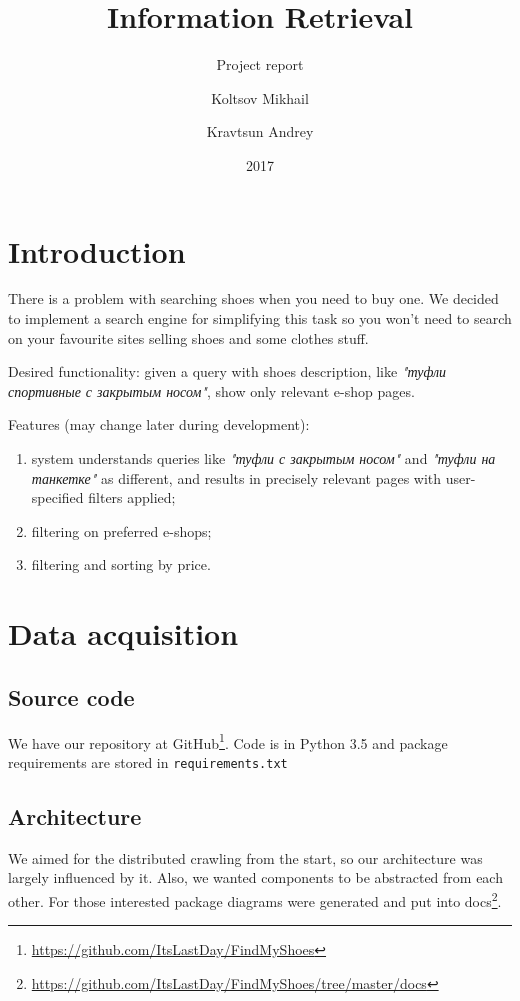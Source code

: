 \documentclass[format=sigconf]{acmart}
\title{Information Retrieval}
\subtitle{Project report}
\author{Koltsov Mikhail}
\author{Kravtsun Andrey}
\date{2017}
\begin{document}
\maketitle

\section{Introduction}
There is a problem with searching shoes when you need to buy one. We decided to implement a search engine for sim\-pli\-fy\-ing this task so you won't need to search on your favourite sites selling shoes and some clothes stuff.

Desired functionality: given a query with shoes description, like \textit{"туфли спортивные с закрытым носом"}, show only re\-le\-vant e-shop pages.

Features (may change later during development):
\begin{enumerate}
    \item system understands queries like \textit{"туфли с закрытым носом"} and \textit{"туфли на танкетке"} as different, and results in precisely relevant pages with user-specified filters applied;
    \item filtering on preferred e-shops;
    \item filtering and sorting by price.
\end{enumerate}

\section{Data acquisition}
\subsection{Source code}
    We have our repository at GitHub\footnote{\url{https://github.com/ItsLastDay/FindMyShoes}}. 
    Code is in Python 3.5 and package requirements are stored in \texttt{requirements.txt}
    
\subsection{Architecture}
    We aimed for the distributed crawling from the start, so our architecture was largely influenced by it. Also, we wanted com\-po\-nents to be abstracted from each other. For those interested package diagrams were generated and put into docs\footnote{\url{https://github.com/ItsLastDay/FindMyShoes/tree/master/docs}}.
    
\end{document}
